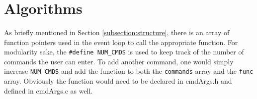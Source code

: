 \documentclass[10pt]{article}
\begin{document}
	\hspace{5mm}
	\hspace{5mm}

\section{Algorithms}
\label{section:algorithms}
\paragraph{}
As briefly mentioned in Section \ref{subsection:structure}, there is an array of function pointers used in the event loop to call the appropriate function. For modularity sake, the \texttt{\#define NUM\_CMDS} is used to keep track of the number of commands the user can enter. To add another command, one would simply increase \texttt{NUM\_CMDS} and add the function to both the \texttt{commands} array and the \texttt{func} array. Obviously the function would need to be declared in cmdArgs.h and defined in cmdArgs.c as well.
\end{document}
